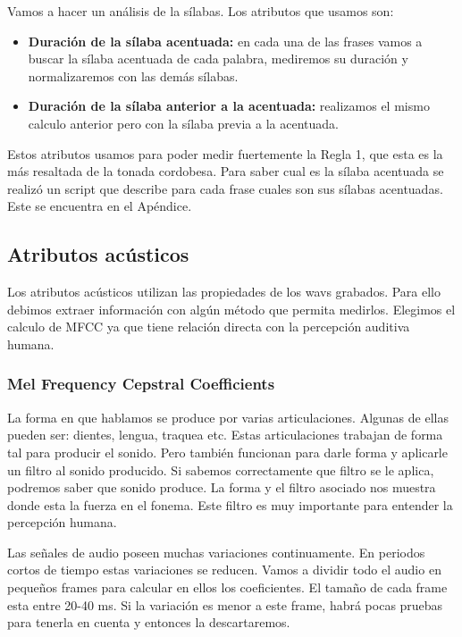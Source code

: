 Vamos a hacer un análisis de la sílabas. Los atributos que usamos son:

\begin{itemize}
    \item \textbf{Duración de la sílaba acentuada:} en cada una de las frases vamos a buscar la sílaba acentuada de cada palabra, mediremos su duración y normalizaremos con las demás sílabas.
    \item \textbf{Duración de la sílaba anterior a la acentuada:} realizamos el mismo calculo anterior pero con la sílaba previa a la acentuada. 
\end{itemize}

Estos atributos usamos para poder medir fuertemente la Regla 1, que esta es la más resaltada de la tonada cordobesa. Para saber cual es la sílaba acentuada se realizó un script que describe para cada frase cuales son sus sílabas acentuadas. Este se encuentra en el Apéndice.

\subsection{Atributos acústicos}

Los atributos acústicos utilizan las propiedades de los wavs grabados. Para ello debimos extraer información con algún método que permita medirlos. Elegimos el calculo de MFCC ya que tiene relación directa con la percepción auditiva humana. 

\subsubsection{Mel Frequency Cepstral Coefficients}


La forma en que hablamos se produce por varias articulaciones. Algunas de ellas pueden ser: dientes, lengua, traquea etc. Estas articulaciones trabajan de forma tal para producir el sonido. Pero también funcionan para darle forma y aplicarle un filtro al sonido producido. Si sabemos correctamente que filtro se le aplica, podremos saber que sonido produce. La forma y el filtro asociado nos muestra donde esta la fuerza en el fonema. Este filtro es muy importante para entender la percepción humana.

Las señales de audio poseen muchas variaciones continuamente. En periodos cortos de tiempo estas variaciones se reducen. Vamos a dividir todo el audio en pequeños frames para calcular en ellos los coeficientes. El tamaño de cada frame esta entre 20-40 ms. Si la variación es menor a este frame, habrá pocas pruebas para tenerla en cuenta y entonces la descartaremos.


